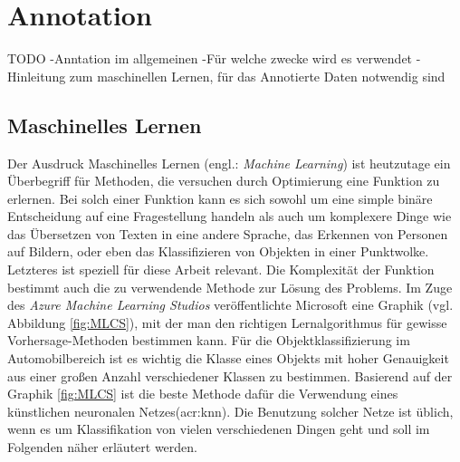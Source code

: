 \graphicspath{{Kapitel/Kapitel2_Grundlagen/Images/}}


\section{Annotation}
\label{sec:Annotation}
TODO
-Anntation im allgemeinen
-Für welche zwecke wird es verwendet
-Hinleitung zum maschinellen Lernen, für das Annotierte Daten notwendig sind

\subsection{Maschinelles Lernen}
\label{sec:MLearning}
Der Ausdruck Maschinelles Lernen (engl.: \textit{Machine Learning}) ist heutzutage ein Überbegriff für Methoden, die versuchen durch Optimierung eine Funktion zu erlernen. Bei solch einer Funktion kann es sich sowohl um eine simple binäre Entscheidung auf eine Fragestellung handeln als auch um komplexere Dinge wie das Übersetzen von Texten in eine andere Sprache, das Erkennen von Personen auf Bildern, oder eben das Klassifizieren von Objekten in einer Punktwolke. Letzteres ist speziell für diese Arbeit relevant. Die Komplexität der Funktion bestimmt auch die zu verwendende Methode zur Lösung des Problems. Im Zuge des \textit{Azure Machine Learning Studios} veröffentlichte Microsoft eine Graphik (vgl. Abbildung \ref{fig:MLCS}), mit der man den richtigen Lernalgorithmus für gewisse Vorhersage-Methoden bestimmen kann. Für die Objektklassifizierung im Automobilbereich ist es wichtig die Klasse eines Objekts mit hoher Genauigkeit aus einer großen Anzahl verschiedener Klassen zu bestimmen. Basierend auf der Graphik \ref{fig:MLCS} ist die beste Methode dafür die Verwendung eines künstlichen neuronalen Netzes(\acrshort{acr:knn}). Die Benutzung solcher Netze ist üblich, wenn es um Klassifikation von vielen verschiedenen Dingen geht und soll im Folgenden näher erläutert werden.\\

